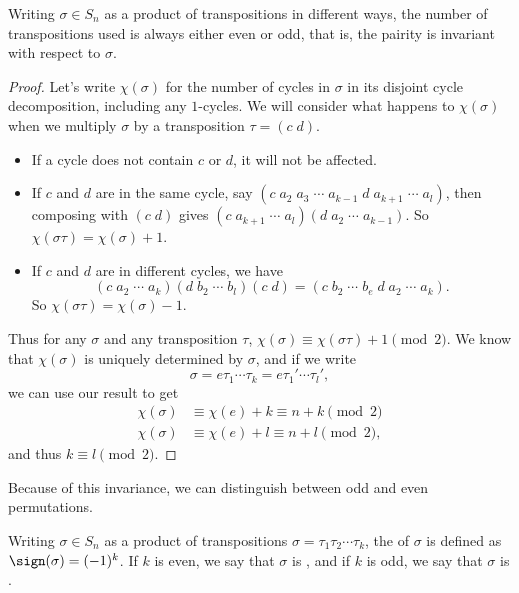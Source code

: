 \begin{theorem}
	Writing $\sigma \in S_n$ as a product of transpositions in different ways, the number of transpositions used is always either even or odd, that is, the pairity is invariant with respect to $\sigma$.
\end{theorem}
\begin{proof}
	Let's write $\chi(\sigma)$ for the number of cycles in $\sigma$ in its disjoint cycle decomposition, including any $1$-cycles. We will consider what happens to $\chi(\sigma)$ when we multiply $\sigma$ by a transposition $\tau = (c \; d)$.
	\begin{itemize}
		\item If a cycle does not contain $c$ or $d$, it will not be affected.
		\item If $c$ and $d$ are in the same cycle, say $(c\; a_2\; a_3\; \cdots \; a_{k - 1} \; d \; a_{k + 1}\; \cdots \; a_l)$, then composing with $(c\; d)$ gives $(c\; a_{k + 1}\; \cdots \; a_l)(d\; a_2\; \cdots\; a_{k - 1})$. So $\chi(\sigma \tau) = \chi(\sigma) + 1$.
		\item If $c$ and $d$ are in different cycles, we have
		$$
		(c\; a_2\; \cdots\; a_k)(d\; b_2\; \cdots\; b_l)(c\; d) = (c \; b_2 \; \cdots\; b_e \; d \; a_2 \; \cdots \; a_k).
		$$
		So $\chi(\sigma \tau) = \chi(\sigma) - 1$.
	\end{itemize}
	Thus for any $\sigma$ and any transposition $\tau$, $\chi(\sigma) \equiv \chi(\sigma \tau) + 1 \pmod{2}$.
	We know that $\chi(\sigma)$ is uniquely determined by $\sigma$, and if we write
	$$
	\sigma = e\tau_1 \cdots \tau_k = e\tau_1 ' \cdots \tau_l ',
	$$
	we can use our result to get
	\begin{align*}
		\chi(\sigma) &\equiv \chi(e) + k \equiv n + k \pmod{2} \\
		\chi(\sigma) &\equiv \chi(e) + l \equiv n + l \pmod{2},
	\end{align*}
	and thus $k \equiv l \pmod{2}$.
\end{proof}

Because of this invariance, we can distinguish between odd and even permutations.
\begin{definition}
	Writing $\sigma \in S_n$ as a product of transpositions $\sigma = \tau_1 \tau_2 \cdots \tau_k$, the  of $\sigma$ is defined as $\sign(\sigma) = (-1)^k$. If $k$ is even, we say that $\sigma$ is , and if $k$ is odd, we say that $\sigma$ is .
\end{definition} 

